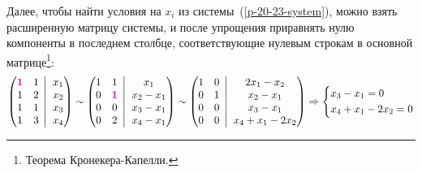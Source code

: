 \documentclass[a4paper,12pt]{article}
\newcommand{\BigMiddleFour}{\;\left|\vphantom{\begin{pmatrix} 0\\0\\0\\0 \end{pmatrix}}\right.\;}
\begin{document}
\begin{solution}
    Далее, чтобы найти условия на $x_i$ из системы~(\ref{p-20-23-system}), можно взять расширенную матрицу системы, и после упрощения приравнять нулю компоненты в последнем столбце, соответствующие нулевым строкам в основной матрице\footnote{Теорема Кронекера-Капелли.}:
    \[
      \left(
        \begin{matrix}
          \textcolor{pink}{\bds 1} & 1\\
          1 & 2\\
          1 & 1\\
          1 & 3
        \end{matrix} \BigMiddleFour \begin{matrix}
          x_1 \\ x_2 \\ x_3 \\ x_4
        \end{matrix}
      \right)
      \sim \left(
        \begin{matrix}
          1 & 1\\
          0 & \textcolor{pink}{\bds 1}\\
          0 & 0\\
          0 & 2
        \end{matrix} \BigMiddleFour \begin{matrix}
          x_1 \\ x_2 - x_1 \\ x_3 - x_1 \\ x_4 - x_1
        \end{matrix}
      \right)
      \sim \left(
        \begin{matrix}
          1 & 0\\
          0 & 1\\
          0 & 0\\
          0 & 0
        \end{matrix} \BigMiddleFour \begin{matrix}
          2x_1 - x_2 \\ x_2 - x_1 \\ x_3 - x_1 \\ x_4 + x_1 - 2x_2
        \end{matrix}
      \right)
      \Rightarrow \left\{
        \begin{aligned}
          &x_3 - x_1 = 0\\
          &x_4 + x_1 - 2x_2 = 0
        \end{aligned}
      \right.
    \]
  \end{solution}
  
\end{document}
